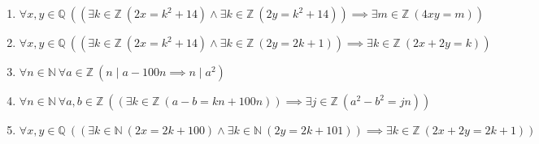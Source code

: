 \documentclass[11pt,a4paper]{article}
\begin{document}
\begin{enumerate}
\item $\displaystyle \forall x, y \in \mathbb{Q}\ ((\exists k \in \mathbb{Z}\ (2x = k^{2} + 14) \land \exists k \in \mathbb{Z}\ (2y = k^{2} + 14)) \implies \exists m \in \mathbb{Z}\ (4xy = m))$
\item $\displaystyle \forall x, y \in \mathbb{Q}\ ((\exists k \in \mathbb{Z}\ (2x = k^{2} + 14) \land \exists k \in \mathbb{Z}\ (2y = 2k + 1)) \implies \exists k \in \mathbb{Z}\ (2x + 2y = k))$
\item $\displaystyle \forall n \in \mathbb{N}\ \forall a \in \mathbb{Z}\ (n \mid a - 100n \implies n \mid a^{2})$
\item $\displaystyle \forall n \in \mathbb{N}\ \forall a, b \in \mathbb{Z}\ ((\exists k \in \mathbb{Z}\ (a - b = kn + 100n)) \implies \exists j \in \mathbb{Z}\ (a^{2} - b^{2} = jn))$
\item $\displaystyle \forall x, y \in \mathbb{Q}\ ((\exists k \in \mathbb{N}\ (2x = 2k + 100) \land \exists k \in \mathbb{N}\ (2y = 2k + 101)) \implies \exists k \in \mathbb{Z}\ (2x + 2y = 2k + 1))$
\end{enumerate}
\end{document}
